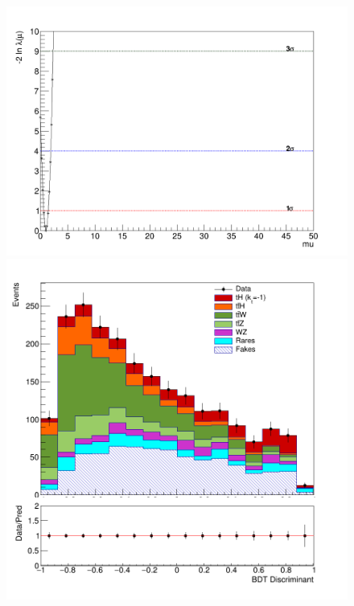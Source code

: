 \begin{linenumbers}
\begin{figure}[!htbp]
\begin{minipage}[b]{0.48\textwidth}
			\includegraphics[width=\textwidth]{Chapter4/kt-1/150fb/Likelihood.png}
		\end{minipage}
		\begin{minipage}[b]{0.48\textwidth}
			\includegraphics[width=\textwidth]{Chapter4/kt-1/300fb/simple-300-kt-1.png}
		\end{minipage}
		\hfill
		\begin{minipage}[b]{0.48\textwidth}

\end{minipage}
\end{figure}
\end{linenumbers}
